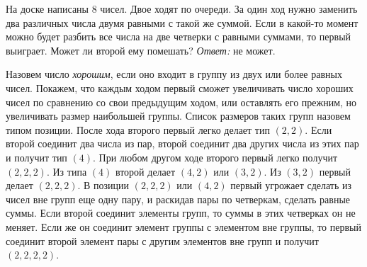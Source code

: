 \problem
На доске написаны $8$ чисел.
Двое ходят по очереди.
За один ход нужно заменить два различных числа двумя равными с такой же суммой.
Если в какой-то момент можно будет разбить все числа на две четверки с равными
суммами, то первый выиграет.
Может ли второй ему помешать?
\solution
\emph{Ответ:} не может.
\par
Назовем число \emph{хорошим}, если оно входит в группу из двух или более равных
чисел.
Покажем, что каждым ходом первый сможет увеличивать число хороших чисел по
сравнению со свои предыдущим ходом, или оставлять его прежним, но увеличивать
размер наибольшей группы.
Список размеров таких групп назовем типом позиции.
После хода второго первый легко делает тип $(2, 2)$.
Если второй соединит два числа из пар, второй соединит два других числа из этих
пар и получит тип $(4)$.
При любом другом ходе второго первый легко получит $(2, 2, 2)$.
Из типа $(4)$ второй делает $(4, 2)$ или $(3, 2)$.
Из $(3, 2)$ первый делает $(2, 2, 2)$.
В позиции $(2, 2, 2)$ или $(4, 2)$ первый угрожает сделать из чисел вне групп
еще одну пару, и раскидав пары по четверкам, сделать равные суммы.
Если второй соединит элементы групп, то суммы в этих четверках он не меняет.
Если же он соединит элемент группы с элементом вне группы, то первый соединит
второй элемент пары с другим элементов вне групп и получит $(2, 2, 2, 2)$.
\endproblem
